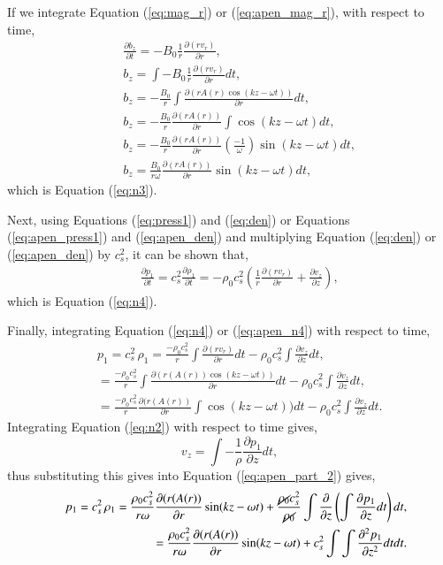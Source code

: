 If we integrate Equation (\ref{eq:mag_r}) or (\ref{eq:apen_mag_r}), with respect to time,
\begin{align}
&&\frac{\partial b_z}{\partial t}=-B_0\frac{1}{r}\frac{\partial (rv_r)}{\partial r},\\
&& b_z = \int -B_0\frac{1}{r}\frac{\partial (rv_r)}{\partial r} dt,\\
&& b_z =  -\frac{B_0}{r}\int\frac{\partial (rA(r)\cos(kz-\omega t))}{\partial r} dt,\\
&& b_z =  -\frac{B_0}{r}\frac{\partial (rA(r))}{\partial r}\int \cos(kz-\omega t) dt,\\
&& b_z =  -\frac{B_0}{r}\frac{\partial (rA(r))}{\partial r}\left(\frac{-1}{\omega}\right) \sin(kz-\omega t) dt,\\
&& b_z =  \frac{B_0}{r\omega}\frac{\partial (rA(r))}{\partial r}\sin(kz-\omega t) dt,
\end{align}
which is Equation (\ref{eq:n3}).

Next, using Equations (\ref{eq:press1}) and (\ref{eq:den}) or Equations (\ref{eq:apen_press1}) and (\ref{eq:apen_den}) and multiplying Equation (\ref{eq:den}) or (\ref{eq:apen_den}) by $c_s^2$, it can be shown that,
\begin{align}
&&\frac{\partial p_1}{\partial t}=c_s^2\frac{\partial\rho_1}{\partial t}=-\rho_0 c_s^2\left(\frac{1}{r}\frac{\partial(rv_r)}{\partial r}+\frac{\partial v_z}{\partial z}\right)\label{eq:apen_n4},
\end{align}
which is Equation (\ref{eq:n4}).

Finally, integrating Equation (\ref{eq:n4}) or (\ref{eq:apen_n4}) with respect to time,
\begin{align}
&& p_1 =c_s^2\,\rho_1 = \frac{-\rho_0 c_s^2}{r} \int \frac{\partial(rv_r)}{\partial r} dt - \rho_0 c_s^2 \int \frac{\partial v_z}{\partial z} dt, \\
&& =\frac{-\rho_0 c_s^2}{r} \int \frac{\partial(r(A(r))\cos(kz-\omega t))}{\partial r} dt - \rho_0 c_s^2 \int \frac{\partial v_z}{\partial z} dt, \\
&& =\frac{-\rho_0 c_s^2}{r} \frac{\partial(r(A(r))}{\partial r} \int \cos(kz-\omega t)) dt - \rho_0 c_s^2 \int \frac{\partial v_z}{\partial z} dt.\label{eq:apen_part_2}
\end{align}
Integrating Equation (\ref{eq:n2}) with respect to time gives, $$v_z = \int -\frac{1}{\rho} \frac{\partial p_1}{\partial z} dt,$$ thus substituting this gives into Equation (\ref{eq:apen_part_2}) gives,
\begin{align}
&& p_1 = c_s^2\,\rho_1 =\frac{\rho_0 c_s^2}{r\omega}\frac{\partial(r(A(r))}{\partial r} \sin(kz-\omega t) + \frac{\cancel{\rho_0} c_s^2}{\cancel{\rho_0}} \int \frac{\partial}{\partial z} \left(\int \frac{\partial p_1}{\partial z} dt \right) dt,\\
&& = \frac{\rho_0 c_s^2}{r\omega}\frac{\partial(r(A(r))}{\partial r} \sin(kz-\omega t)  + c_s^2 \int\int \frac{\partial^2 p_1}{\partial z^2} dt dt.\label{eq:apen_wow}
\end{align}

